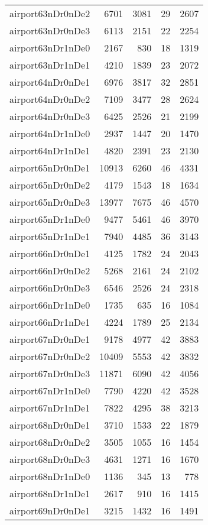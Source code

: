 \begin{longtable}{lrrrr}
airport63nDr0nDe2 & 6701 & 3081 & 29 & 2607 \\
airport63nDr0nDe3 & 6113 & 2151 & 22 & 2254 \\
airport63nDr1nDe0 & 2167 & 830 & 18 & 1319 \\
airport63nDr1nDe1 & 4210 & 1839 & 23 & 2072 \\
airport64nDr0nDe1 & 6976 & 3817 & 32 & 2851 \\
airport64nDr0nDe2 & 7109 & 3477 & 28 & 2624 \\
airport64nDr0nDe3 & 6425 & 2526 & 21 & 2199 \\
airport64nDr1nDe0 & 2937 & 1447 & 20 & 1470 \\
airport64nDr1nDe1 & 4820 & 2391 & 23 & 2130 \\
airport65nDr0nDe1 & 10913 & 6260 & 46 & 4331 \\
airport65nDr0nDe2 & 4179 & 1543 & 18 & 1634 \\
airport65nDr0nDe3 & 13977 & 7675 & 46 & 4570 \\
airport65nDr1nDe0 & 9477 & 5461 & 46 & 3970 \\
airport65nDr1nDe1 & 7940 & 4485 & 36 & 3143 \\
airport66nDr0nDe1 & 4125 & 1782 & 24 & 2043 \\
airport66nDr0nDe2 & 5268 & 2161 & 24 & 2102 \\
airport66nDr0nDe3 & 6546 & 2526 & 24 & 2318 \\
airport66nDr1nDe0 & 1735 & 635 & 16 & 1084 \\
airport66nDr1nDe1 & 4224 & 1789 & 25 & 2134 \\
airport67nDr0nDe1 & 9178 & 4977 & 42 & 3883 \\
airport67nDr0nDe2 & 10409 & 5553 & 42 & 3832 \\
airport67nDr0nDe3 & 11871 & 6090 & 42 & 4056 \\
airport67nDr1nDe0 & 7790 & 4220 & 42 & 3528 \\
airport67nDr1nDe1 & 7822 & 4295 & 38 & 3213 \\
airport68nDr0nDe1 & 3710 & 1533 & 22 & 1879 \\
airport68nDr0nDe2 & 3505 & 1055 & 16 & 1454 \\
airport68nDr0nDe3 & 4631 & 1271 & 16 & 1670 \\
airport68nDr1nDe0 & 1136 & 345 & 13 & 778 \\
airport68nDr1nDe1 & 2617 & 910 & 16 & 1415 \\
airport69nDr0nDe1 & 3215 & 1432 & 16 & 1491 \\

\end{longtable}
